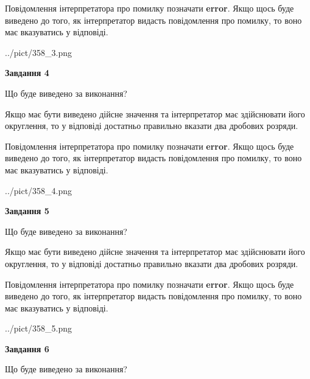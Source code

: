\documentclass[12pt, ukrainian]{article}
\begin{document}
{\begin {Large}
Повідомлення інтерпретатора про помилку позначати \textbf{error}.
Якщо щось буде виведено до того, як інтерпретатор видасть повідомлення про помилку, 
то воно має вказуватись у відповіді. \par

\begin{center}
	{../pict/358_3.png}
\end{center}
\newpage

{\begin {center}\textbf{Завдання 4}\end {center}}\par
Що буде виведено за виконання? \par

Якщо має бути виведено дійсне значення та інтерпретатор має здійснювати його округлення, 
то у відповіді достатньо правильно вказати два дробових розряди.

Повідомлення інтерпретатора про помилку позначати \textbf{error}.
Якщо щось буде виведено до того, як інтерпретатор видасть повідомлення про помилку, 
то воно має вказуватись у відповіді. \par

\begin{center}
	{../pict/358_4.png}
\end{center}
\newpage

{\begin {center}\textbf{Завдання 5}\end {center}}\par
Що буде виведено за виконання? \par

Якщо має бути виведено дійсне значення та інтерпретатор має здійснювати його округлення, 
то у відповіді достатньо правильно вказати два дробових розряди.

Повідомлення інтерпретатора про помилку позначати \textbf{error}.
Якщо щось буде виведено до того, як інтерпретатор видасть повідомлення про помилку, 
то воно має вказуватись у відповіді. \par

\begin{center}
	{../pict/358_5.png}
\end{center}
\newpage

{\begin {center}\textbf{Завдання 6}\end {center}}\par
Що буде виведено за виконання? \par


\end{Large}}
\end{document}
